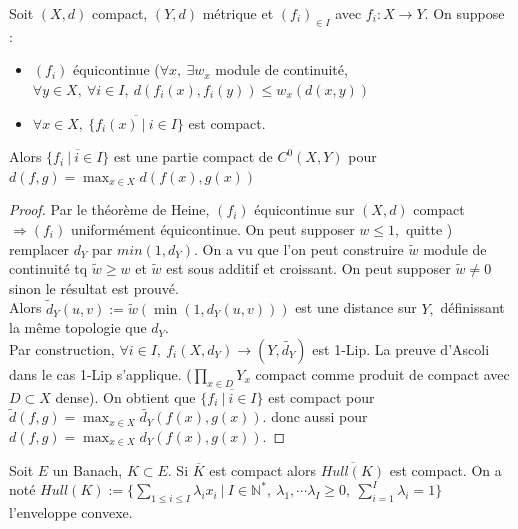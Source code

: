 \begin{theoreme}
    Soit $(X,d)$ compact, $(Y,d)$ métrique et $(f_i)_{\in I}$ avec $f_i:X\to Y.$ On suppose :
    \begin{itemize}
        \item $(f_i)$ équicontinue ($\forall x,\ \exists w_x$ module de continuité, $\forall y\in X,\ \forall i\in I,\ d(f_i(x),f_i(y))\le w_x(d(x,y))  $
        \item  $\forall x\in X,\ \overline{\{f_i(x)\ |\ i\in I\} } $ est compact.
    \end{itemize}
    Alors $\overline{\{f_i\ |\ i\in I\} }$ est une partie compact de $C^0(X,Y)$  pour $d(f,g)=\max_{x\in X}d(f(x),g(x))$
\end{theoreme}
\begin{proof}
    Par le théorème de Heine, $(f_i)$ équicontinue sur $(X,d)$ compact $\Rightarrow (f_i)$ uniformément équicontinue. On peut supposer $w\le 1,$ quitte ) remplacer $d_Y$ par $min(1,d_Y).$ On a vu que l'on peut construire $\tilde{w}$ module de continuité tq $\tilde{w}\ge w$ et $\tilde{w}$ est sous additif et croissant. On peut supposer $\tilde{w}\neq 0$ sinon le résultat est prouvé. \\
    Alors $\tilde{d}_Y(u,v):=\tilde{w}(\min(1,d_Y(u,v)))$ est une distance sur $Y,$ définissant la même topologie que $d_Y$.\\
    Par construction, $\forall i\in I,\ f_i(X,d_Y)\to (Y,\tilde{d_{Y}}) $ est 1-Lip. La preuve d'Ascoli dans le cas 1-Lip s'applique. ($\prod\limits_{x\in D}^{}Y_x$ compact comme produit de compact avec $D\subset X$ dense). On obtient  que $\overline{\{f_i\ |\ i\in I\} }$ est compact pour $\tilde{d}(f,g)=\max_{x\in X}\tilde{d_Y}(f(x),g(x)).$ donc aussi pour  $d(f,g)=\max_{x\in X}d_Y(f(x),g(x)).$
\end{proof}
\begin{propriete}
	\hypertarget{hull}{
    Soit $E$ un Banach, $K\subset E.$ Si $\overline{K}$ est compact alors $\overline{Hull(K)}$ est compact. On a noté $Hull(K):=\{\sum\limits_{1\le i\le I}^{} \lambda_ix_i\ |\ I\in \mathbb{N} ^*,\ \lambda_1,\cdots\lambda_I\ge 0,\ \sum\limits_{i=1}^{I} \lambda_i=1\} $ l'enveloppe convexe.}
\end{propriete}
